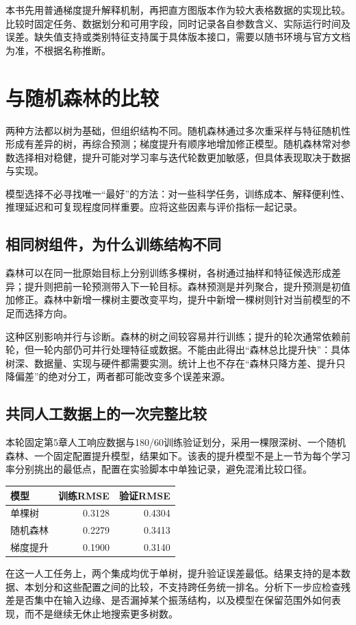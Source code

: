 本书先用普通梯度提升解释机制，再把直方图版本作为较大表格数据的实现比较。比较时固定任务、数据划分和可用字段，同时记录各自参数含义、实际运行时间及误差。缺失值支持或类别特征支持属于具体版本接口，需要以随书环境与官方文档为准，不根据名称推断。

\section{与随机森林的比较}
两种方法都以树为基础，但组织结构不同。随机森林通过多次重采样与特征随机性形成有差异的树，再综合预测；梯度提升有顺序地增加修正模型。随机森林常对参数选择相对稳健，提升可能对学习率与迭代轮数更加敏感，但具体表现取决于数据与实现。



模型选择不必寻找唯一“最好”的方法：对一些科学任务，训练成本、解释便利性、推理延迟和可复现程度同样重要。应将这些因素与评价指标一起记录。

\subsection{相同树组件，为什么训练结构不同}
森林可以在同一批原始目标上分别训练多棵树，各树通过抽样和特征候选形成差异；提升则把前一轮预测带入下一轮目标。森林预测是并列聚合，提升预测是初值加修正。森林中新增一棵树主要改变平均，提升中新增一棵树则针对当前模型的不足而选择方向。

这种区别影响并行与诊断。森林的树之间较容易并行训练；提升的轮次通常依赖前轮，但一轮内部仍可并行处理特征或数据。不能由此得出“森林总比提升快”：具体树深、数据量、实现与硬件都需要实测。统计上也不存在“森林只降方差、提升只降偏差”的绝对分工，两者都可能改变多个误差来源。

\subsection{共同人工数据上的一次完整比较}
本轮固定第5章人工响应数据与180/60训练验证划分，采用一棵限深树、一个随机森林、一个固定配置提升模型，结果如下。该表的提升模型不是上一节为每个学习率分别挑出的最低点，配置在实验脚本中单独记录，避免混淆比较口径。
\begin{center}\small
\begin{tabular}{lrr}\toprule
模型&训练RMSE&验证RMSE\\\midrule
单棵树&0.3128&0.4304\\
随机森林&0.2279&0.3413\\
梯度提升&0.1900&0.3140\\\bottomrule
\end{tabular}\end{center}
在这一人工任务上，两个集成均优于单树，提升验证误差最低。结果支持的是本数据、本划分和这些配置之间的比较，不支持跨任务统一排名。分析下一步应检查残差是否集中在输入边缘、是否漏掉某个振荡结构，以及模型在保留范围外如何表现，而不是继续无休止地搜索更多树数。

